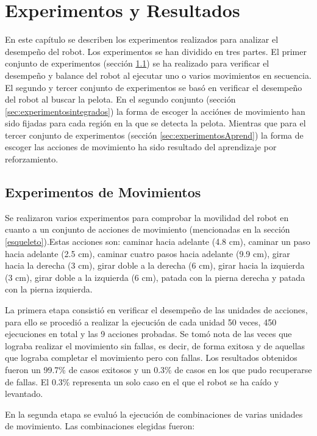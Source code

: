 \chapter{Experimentos y Resultados}\label{chapter:resultados}
En este capítulo se describen los experimentos realizados para analizar el desempeño del robot. Los experimentos se han dividido en tres partes. El primer conjunto de experimentos (sección \ref{sec:experimentosMov}) se ha realizado para verificar el desempeño y balance del robot al ejecutar uno o varios movimientos en secuencia. El segundo y tercer conjunto de experimentos se bas\'o en verificar el desempeño del robot al buscar la pelota. En el segundo conjunto (sección \ref{sec:experimentosintegrados}) la forma de escoger la acciónes de movimiento han sido fijadas para cada región en la que se detecta la pelota. Mientras que para el tercer conjunto de experimentos (secci\'on \ref{sec:experimentosAprend}) la forma de escoger las acciones de movimiento ha sido resultado del aprendizaje por reforzamiento. 
 
\section{Experimentos de Movimientos}\label{sec:experimentosMov}

Se realizaron varios experimentos para comprobar la movilidad del robot en cuanto a un conjunto de acciones de movimiento (mencionadas en la sección \ref{esqueleto}).Estas acciones son: caminar hacia adelante (4.8 cm), caminar un paso hacia adelante (2.5 cm), caminar cuatro pasos hacia adelante (9.9 cm), girar hacia la derecha (3 cm), girar doble a la derecha (6 cm), girar hacia la izquierda (3 cm), girar doble a la izquierda (6 cm), patada con la pierna derecha y patada con la pierna izquierda.

La primera etapa consistió en verificar el desempeño de las unidades de acciones, para ello se procedió a realizar la ejecución de cada unidad 50 veces, 450 ejecuciones en total y las 9 acciones probadas. Se tomó nota de las veces que lograba realizar el movimiento sin fallas, es decir, de forma exitosa y de aquellas que lograba completar el movimiento pero con fallas. Los resultados obtenidos fueron un 99.7\% de casos exitosos y un 0.3\% de casos en los que pudo recuperarse de fallas. El 0.3\% representa un solo caso en el que el robot se ha caído y levantado.  

En la segunda etapa se evalu\'o la ejecuci\'on de combinaciones de varias unidades de movimiento. Las combinaciones elegidas fueron: 

